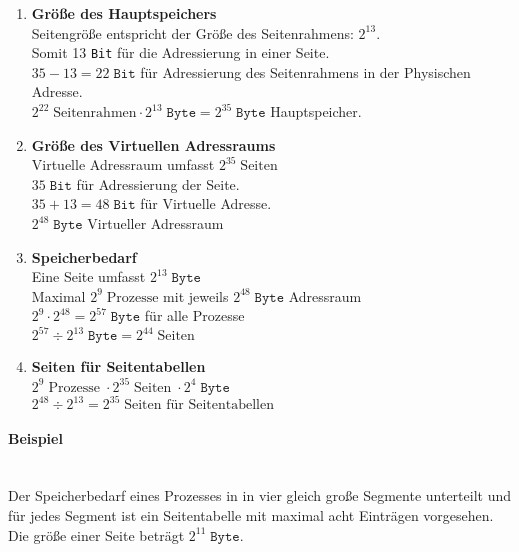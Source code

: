 \documentclass[10pt,a4paper]{article}
\begin{document}
\begin{multicols*}{4}
\begin{enumerate}
	\item\textbf{Größe des Hauptspeichers}\hfill\\
	      Seitengröße entspricht der Größe des Seitenrahmens: \(2^{13}\). \\
	      Somit 13 \texttt{Bit} für die Adressierung in einer Seite. \\
	      \(35 - 13 = 22\;\texttt{Bit}\) für Adressierung des Seitenrahmens in der Physischen Adresse. \\
	      \(2^{22}\;\text{Seitenrahmen} \cdot 2^{13}\;\texttt{Byte} = 2^{35}\;\texttt{Byte}\) Hauptspeicher.
	\item\textbf{Größe des Virtuellen Adressraums}\hfill\\
	      Virtuelle Adressraum umfasst \(2^{35}\;\text{Seiten}\) \\
	      \(35\;\texttt{Bit}\) für Adressierung der Seite. \\
	      \(35 + 13 = 48\;\texttt{Bit}\) für Virtuelle Adresse. \\
	      \(2^{48}\;\texttt{Byte}\) Virtueller Adressraum
	\item\textbf{Speicherbedarf}\hfill\\
	      Eine Seite umfasst \(2^{13}\;\texttt{Byte}\) \\
	      Maximal \(2^{9}\;\text{Prozesse}\) mit jeweils \(2^{48}\;\texttt{Byte}\) Adressraum \\
	      \(2^{9} \cdot 2^{48} = 2^{57}\;\texttt{Byte}\) für alle Prozesse \\
	      \(2^{57} \div 2^{13}\;\texttt{Byte} = 2^{44}\;\text{Seiten}\)
	\item\textbf{Seiten für Seitentabellen}\hfill\\
	      \(2^{9}\;\text{Prozesse}\;\cdot 2^{35}\;\text{Seiten}\;\cdot 2^{4}\;\texttt{Byte}\) \\
	      \(2^{48} \div 2^{13} = 2^{35}\;\text{Seiten für Seitentabellen}\)
\end{enumerate}

\paragraph{Beispiel}\hfill\\
Der Speicherbedarf eines Prozesses in in vier gleich große Segmente unterteilt und für jedes Segment ist ein
Seitentabelle mit maximal acht Einträgen vorgesehen. Die größe einer Seite beträgt \(2^{11}\;\texttt{Byte}\).


\end{multicols*}
\end{document}

